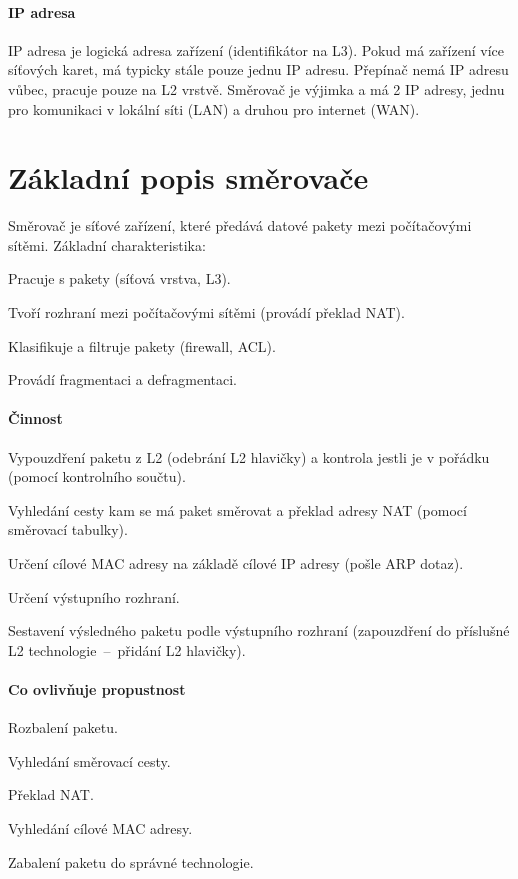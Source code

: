 \paragraph*{IP adresa} IP adresa je logická adresa zařízení (identifikátor na L3). Pokud má zařízení více síťových karet, má typicky stále pouze jednu IP adresu. Přepínač nemá IP adresu vůbec, pracuje pouze na L2 vrstvě. Směrovač je výjimka a má 2 IP adresy, jednu pro komunikaci v lokální síti (LAN) a druhou pro internet (WAN).


\section{Základní popis směrovače}

Směrovač je síťové zařízení, které předává datové pakety mezi počítačovými sítěmi. Základní charakteristika: \begin{compactitem}
    \item Pracuje s pakety (síťová vrstva, L3).
    \item Tvoří rozhraní mezi počítačovými sítěmi (provádí překlad NAT).
    \item Klasifikuje a filtruje pakety (firewall, ACL).
    \item Provádí fragmentaci a defragmentaci.
\end{compactitem}

\paragraph*{Činnost} \begin{compactenum}
    \item Vypouzdření paketu z L2 (odebrání L2 hlavičky) a kontrola jestli je v pořádku (pomocí kontrolního součtu).
    \item Vyhledání cesty kam se má paket směrovat a překlad adresy NAT (pomocí směrovací tabulky).
    \item Určení cílové MAC adresy na základě cílové IP adresy (pošle ARP dotaz).
    \item Určení výstupního rozhraní.
    \item Sestavení výsledného paketu podle výstupního rozhraní (zapouzdření do příslušné L2 technologie~--~přidání L2 hlavičky).
\end{compactenum}

\paragraph*{Co ovlivňuje propustnost} \begin{compactitem}
    \item Rozbalení paketu.
    \item Vyhledání směrovací cesty.
    \item Překlad NAT.
    \item Vyhledání cílové MAC adresy.
    \item Zabalení paketu do správné technologie.
\end{compactitem}

